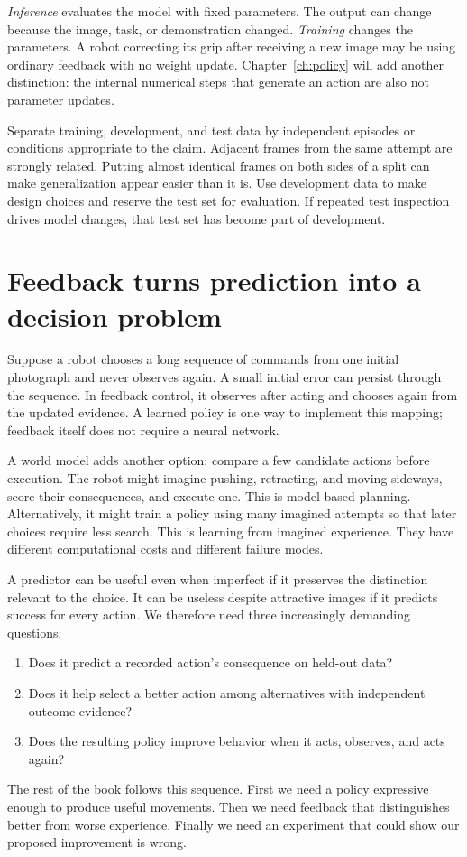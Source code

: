 \emph{Inference} evaluates the model with fixed parameters. The output can change because the image, task, or demonstration changed. \emph{Training} changes the parameters. A robot correcting its grip after receiving a new image may be using ordinary feedback with no weight update. Chapter~\ref{ch:policy} will add another distinction: the internal numerical steps that generate an action are also not parameter updates.

Separate training, development, and test data by independent episodes or conditions appropriate to the claim. Adjacent frames from the same attempt are strongly related. Putting almost identical frames on both sides of a split can make generalization appear easier than it is. Use development data to make design choices and reserve the test set for evaluation. If repeated test inspection drives model changes, that test set has become part of development.

\section{Feedback turns prediction into a decision problem}
Suppose a robot chooses a long sequence of commands from one initial photograph and never observes again. A small initial error can persist through the sequence. In feedback control, it observes after acting and chooses again from the updated evidence. A learned policy is one way to implement this mapping; feedback itself does not require a neural network.

A world model adds another option: compare a few candidate actions before execution. The robot might imagine pushing, retracting, and moving sideways, score their consequences, and execute one. This is model-based planning. Alternatively, it might train a policy using many imagined attempts so that later choices require less search. This is learning from imagined experience. They have different computational costs and different failure modes.

A predictor can be useful even when imperfect if it preserves the distinction relevant to the choice. It can be useless despite attractive images if it predicts success for every action. We therefore need three increasingly demanding questions:
\begin{enumerate}[leftmargin=*]
\item Does it predict a recorded action's consequence on held-out data?
\item Does it help select a better action among alternatives with independent outcome evidence?
\item Does the resulting policy improve behavior when it acts, observes, and acts again?
\end{enumerate}
The rest of the book follows this sequence. First we need a policy expressive enough to produce useful movements. Then we need feedback that distinguishes better from worse experience. Finally we need an experiment that could show our proposed improvement is wrong.

